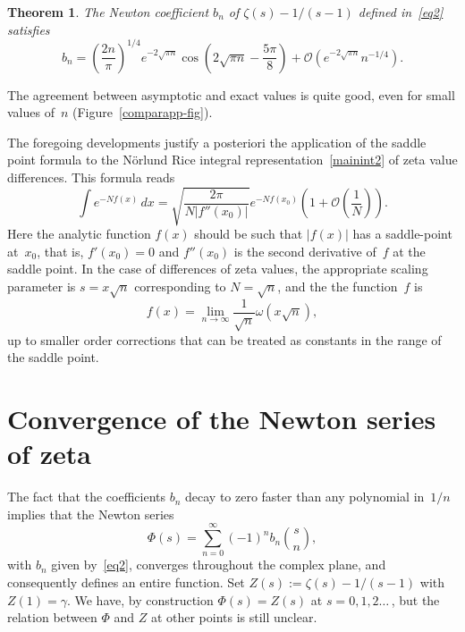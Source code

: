 \documentclass{amsart}
\newtheorem{theorem}{Theorem}
\begin{document}
\begin{theorem} \label{zetacoeff-thm}
The Newton coefficient $b_n$ of $\zeta(s)-1/(s-1)$ defined in~\eqref{eq2}
satisfies
\begin{equation}\label{thmz}
b_n = \left( \frac{2n}{\pi}\right)^{1/4}
e^{-2\sqrt{\pi n}}\cos\left(2\sqrt{\pi n}-\frac{5\pi}{8}\right)
+\mathcal{O}\left(e^{-2\sqrt{\pi n}}n^{-1/4}\right).
\end{equation}
\end{theorem}

The agreement between asymptotic and exact values is quite good,
even for small values of~$n$ (Figure~\ref{comparapp-fig}).

\smallskip

The foregoing developments justify a posteriori the application of the saddle point formula to the N\"orlund Rice
integral representation~\eqref{mainint2} of zeta value differences. This formula
reads
\begin{equation}\label{sadfor}
\int e^{-Nf(x)} \, dx =\sqrt{\frac{2\pi}{N|f''(x_0)|}}
e^{-N f(x_0)}\left(1+\mathcal{O}\left(\frac{1}{N}\right)\right).
\end{equation}
Here the analytic function $f(x)$ should be such that $|f(x)|$ has a saddle-point at~$x_0$,
that is, $f'(x_0)=0$ and $f''(x_0)$ is the second derivative of~$f$ at the saddle point.
In the case of differences of zeta values, 
the appropriate scaling parameter is $s=x\sqrt{n}$ corresponding to $N=\sqrt{n}$, and the
the function~$f$ is
\[
f(x)=\lim_{n\to\infty} \frac{1}{\sqrt{n}}\omega\left(x\sqrt{n}\right),
\]
up to smaller order corrections that can be treated as constants in the range of the saddle point.

\section{Convergence of the Newton series of zeta}\label{conv-sec}

The fact that the coefficients $b_n$ decay to zero faster than any polynomial in~$1/n$ 
implies that the Newton series
\begin{equation}\label{newtonz}
\Phi(s)=\sum_{n=0}^\infty (-1)^n b_n \binom{s}{n},
\end{equation}
with $b_n$ given by~\eqref{eq2},
converges throughout the complex plane, and consequently defines an entire function.
Set $Z(s):=\zeta(s)-1/(s-1)$ with~$Z(1)=\gamma$. We have, by construction $\Phi(s)=Z(s)$
at $s=0,1,2\ldots\,$, but the relation between $\Phi$ and $Z$ at other points is still unclear.
\end{document}
